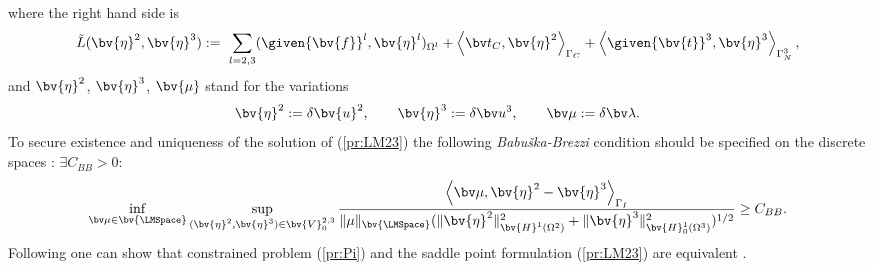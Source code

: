 where the right hand side is
\begin{equation*}
\tilde L(\bv{\eta}^2, \bv{\eta}^3):=\,\, \sum_{l=2,3} 
 (\given{\bv{f}}^{l}, \bv{\eta}^l)_{\Omega^l} 
 + \left\langle \bv t_C, \bv{\eta}^2 \right\rangle_{\Gamma_C}
+ \left\langle \given{\bv{t}}^3, \bv{\eta}^3  \right\rangle_{\Gamma_N^3},
\end{equation*}
and $\bv{\eta}^2$, $\bv{\eta}^3$, $\bv{\mu}$ stand for the variations 
\[
\bv{\eta}^2 := \delta \bv{u}^2, \qquad \bv{\eta}^3 := \delta \bv u^3, \qquad \bv \mu := \delta \bv \lambda.
\]
To secure existence and uniqueness of the solution of (\ref{pr:LM23}) the following {\it Babu\v{s}ka-Brezzi} condition should be specified on the discrete spaces \cite{Br02}:
$\exists C_{BB} > 0$:
\[
\inf \limits_{\bv \mu \in \bv{\LMSpace}} \sup \limits_{(\bv{\eta}^2, \bv{\eta}^3)\in \bv{V}^{2,3}_0} \dfrac{\left\langle \bv \mu, \bv{\eta}^2 - \bv{\eta}^3 \right\rangle_{\Gamma_I}}
{\|\mu\|_{\bv{\LMSpace}} (\|\bv{\eta}^2\|^2_{\bv{H}^1(\Omega^2)}+\|\bv{\eta}^3\|^2_{\bv{H}^1_0(\Omega^3)})^{1/2}}
\geq C_{BB}.
\]
Following \cite{Bel99} one can show that constrained problem (\ref{pr:Pi}) and the saddle point formulation (\ref{pr:LM23}) are equivalent .\\

